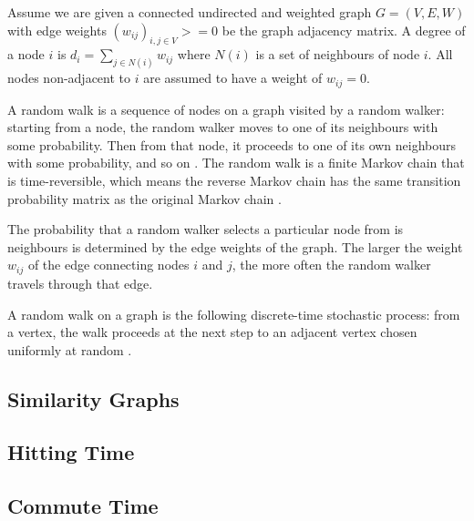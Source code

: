 Assume we are given a connected undirected and weighted graph $G=(V,E,W)$ with
edge weights $(w_{ij})_{i,j \in V}>=0$ be the graph adjacency matrix. A degree
of a node $i$ is $d_i=\sum_{j\in N(i)}w_{ij}$ where $N(i)$ is a set of
neighbours of node $i$. All nodes non-adjacent to $i$ are assumed to have a
weight of $w_{ij}=0$.

A random walk is a sequence of nodes on a graph visited by a random walker:
starting from a node, the random walker moves to one of its neighbours with some
probability. Then from that node, it proceeds to one of its own neighbours with
some probability, and so on \cite{Khoa:2012}. The random walk is a finite Markov
chain that is time-reversible, which means the reverse Markov chain has the same
transition probability matrix as the original Markov chain \cite{Lovasz:1996}.

The probability that a random walker selects a particular node from is
neighbours is determined by the edge weights of the graph. The larger the weight
$w_{ij}$ of the edge connecting nodes $i$ and $j$, the more often the random
walker travels through that edge.

A random walk on a graph is the following discrete-time stochastic process: from a vertex, the walk proceeds at the next step to an adjacent vertex chosen uniformly at random \cite{Chandra:1989}.

\subsection{Similarity Graphs}
\label{similarityGraphs}

\subsection{Hitting Time}
\label{hittingTime}

\subsection{Commute Time}
\label{commuteTime}


